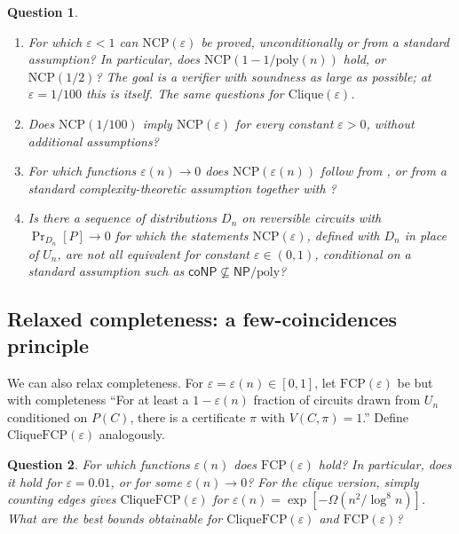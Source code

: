 \documentclass[11pt]{article}
\newtheorem{question}{Question}
\theoremstyle{remark}
\newcommand{\NP}{\mathsf{NP}}
\newcommand{\coNP}{\mathsf{coNP}}
\begin{document}
\begin{question}\label{q:soundness}
\begin{enumerate}
\item For which $\varepsilon < 1$ can $\mathrm{NCP}(\varepsilon)$ be proved, unconditionally or from a standard assumption? In particular, does $\mathrm{NCP}(1 - 1/\mathrm{poly}(n))$ hold, or $\mathrm{NCP}(1/2)$? The goal is a verifier with soundness as large as possible; at $\varepsilon = 1/100$ this is  itself. The same questions for $\mathrm{Clique}(\varepsilon)$.
\item Does $\mathrm{NCP}(1/100)$ imply $\mathrm{NCP}(\varepsilon)$ for every constant $\varepsilon > 0$, without additional assumptions?
\item For which functions $\varepsilon(n) \to 0$ does $\mathrm{NCP}(\varepsilon(n))$ follow from , or from a standard complexity-theoretic assumption together with ?
\item Is there a sequence of distributions $D_n$ on reversible circuits with $\Pr_{D_n}[P] \to 0$ for which the statements $\mathrm{NCP}(\varepsilon)$, defined with $D_n$ in place of $U_n$, are not all equivalent for constant $\varepsilon \in (0, 1)$, conditional on a standard assumption such as $\coNP \not\subseteq \NP/\mathrm{poly}$?
\end{enumerate}
\end{question}

\subsection*{Relaxed completeness: a few-coincidences principle}

We can also relax completeness. For $\varepsilon=\varepsilon(n)\in[0,1]$, let $\mathrm{FCP}(\varepsilon)$ be  but with completeness ``For at least a $1-\varepsilon(n)$ fraction of circuits drawn from $U_n$ conditioned on $P(C)$, there is a certificate $\pi$ with $V(C,\pi)=1$.'' Define $\mathrm{CliqueFCP}(\varepsilon)$ analogously.

\begin{question}\label{q:fcp}
For which functions $\varepsilon(n)$ does $\mathrm{FCP}(\varepsilon)$ hold? In particular, does it hold for $\varepsilon=0.01$, or for some $\varepsilon(n)\to0$?
For the clique version, simply counting edges gives $\mathrm{CliqueFCP}(\varepsilon)$ for $\varepsilon(n)=\exp[-\Omega(n^2/\log^8 n)]$. What are the best bounds obtainable for $\mathrm{CliqueFCP}(\varepsilon)$ and $\mathrm{FCP}(\varepsilon)$?
\end{question}
\end{document}
